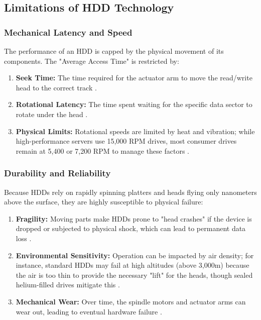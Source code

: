\subsection{Limitations of HDD Technology}

\subsubsection{Mechanical Latency and Speed}
The performance of an HDD is capped by the physical movement of its components. The "Average Access Time" is restricted by:
\begin{enumerate}[label=\roman*.]
    \item \textbf{Seek Time:} The time required for the actuator arm to move the read/write head to the correct track \cite{gfg_hdd_memory, wiki_hdd}.
    \item \textbf{Rotational Latency:} The time spent waiting for the specific data sector to rotate under the head \cite{gfg_hdd_memory, wiki_hdd}.
    \item \textbf{Physical Limits:} Rotational speeds are limited by heat and vibration; while high-performance servers use 15,000 RPM drives, most consumer drives remain at 5,400 or 7,200 RPM to manage these factors \cite{wiki_hdd}.
\end{enumerate}

\subsubsection{Durability and Reliability}
Because HDDs rely on rapidly spinning platters and heads flying only nanometers above the surface, they are highly susceptible to physical failure:
\begin{enumerate}[label=\roman*.]
    \item \textbf{Fragility:} Moving parts make HDDs prone to "head crashes" if the device is dropped or subjected to physical shock, which can lead to permanent data loss \cite{gfg_hdd_memory, wiki_hdd}.
    \item \textbf{Environmental Sensitivity:} Operation can be impacted by air density; for instance, standard HDDs may fail at high altitudes (above 3,000m) because the air is too thin to provide the necessary "lift" for the heads, though sealed helium-filled drives mitigate this \cite{wiki_hdd}.
    \item \textbf{Mechanical Wear:} Over time, the spindle motors and actuator arms can wear out, leading to eventual hardware failure \cite{gfg_hdd_memory}.
\end{enumerate}


